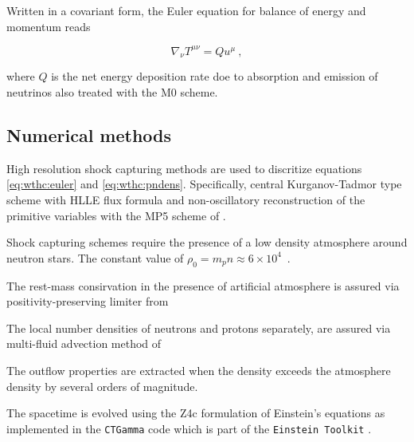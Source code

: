 Written in a covariant form, the Euler equation for balance of energy and momentum reads

\begin{equation}
\label{eq:wthc:euler}
\nabla_\nu T^{\mu\nu} = Q u^{\mu} \ ,
\end{equation}


where $Q$ is the net energy deposition rate doe to absorption
and emission of neutrinos also treated with the M0 scheme.


\subsection{Numerical methods}


High resolution shock capturing methods are used to discritize equations 
\eqref{eq:wthc:euler} and \eqref{eq:wthc:pndens}.
Specifically, central Kurganov-Tadmor type scheme \cite{Kurganov:2000} with 
HLLE flux formula \cite{Einfeldt:1988}
and non-oscillatory reconstruction of the primitive variables with the MP5 scheme of
\cite{Suresh:1997}.

Shock capturing schemes require the presence of a low density atmosphere around neutron stars.
The constant value of $\rho_0 = m_p n \approx 6\times 10^4$~\gcm.

The rest-mass consirvation in the presence of artificial atmosphere is assured via 
positivity-preserving limiter from \cite{Radice:2013xpa}

The local number densities of neutrons and protons separately, are assured via 
multi-fluid advection method of \cite{Plewa:1998nma}

The outflow properties are extracted when the density exceeds the atmosphere density
by several orders of magnitude.

The spacetime is evolved using the Z4c formulation of Einstein's equations
\cite{Bernuzzi:2009ex,Hilditch:2012fp} as implemented in the \texttt{CTGamma} code
\cite{Pollney:2009yz,Reisswig:2013sqa} which is part of the \texttt{Einstein Toolkit} 
\cite{Loffler:2011ay}.

